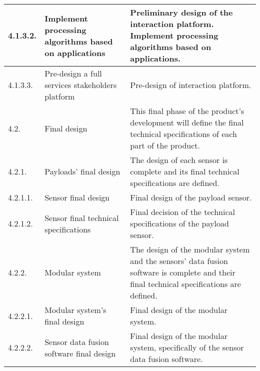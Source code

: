 \begin{longtable}[H]{l >{\raggedright\arraybackslash}p{4cm} p{8cm}}
	\midrule
	
	4.1.3.2. & Implement processing algorithms based on applications & Preliminary design of the interaction platform. Implement processing algorithms based on applications.\vspace{0.2cm} \\
	
	\midrule
	
	4.1.3.3. & Pre-design a full services stakeholders platform & Pre-design of interaction platform.\vspace{0.2cm} \\
	
	\midrule
	
	4.2. & Final design & This final phase of the product's development will define the final technical specifications of each part of the product.\vspace{0.2cm} \\
	
	\midrule
	
	4.2.1. & Payloads' final design & The design of each sensor is complete and its final technical specifications are defined.\vspace{0.2cm} \\
	
	\midrule
	
	4.2.1.1. & Sensor final design & Final design of the payload sensor.\vspace{0.2cm} \\
	
	\midrule
	
	4.2.1.2. & Sensor final technical specifications & Final decision of the technical specifications of the payload sensor.\vspace{0.2cm} \\
	
	\midrule
	
	4.2.2. & Modular system & The design of the modular system and the sensors' data fusion software is complete and their final technical specifications are defined.\vspace{0.2cm} \\
	
	\midrule
	
	4.2.2.1. & Modular system's final design & Final design of the modular system.\vspace{0.2cm} \\
	
	\midrule
	
	4.2.2.2. & Sensor data fusion software final design  & Final design of the modular system, specifically of the sensor data fusion software.\vspace{0.2cm} \\
	

\end{longtable}
